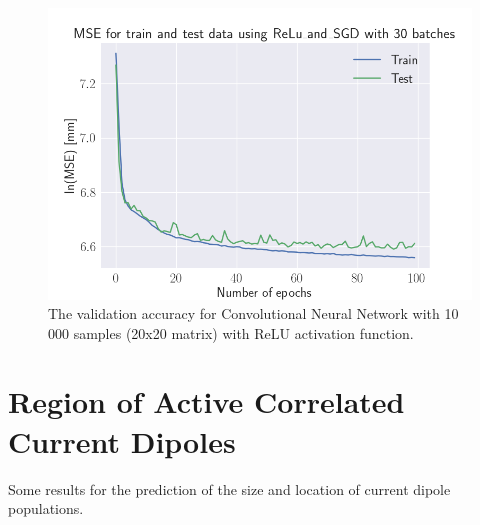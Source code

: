 \documentclass[a4paper, UKenglish, 11pt]{uiomaster}
\begin{document}
\begin{figure}[!htb]
    \centering
    \includegraphics[width=\linewidth]{../Code/plots/finals/MSE_CNN_dipoles_2_interpolated_CNN_20x20_10000_ReLu_and_SGD_30_100.png}
    \caption{The validation accuracy for Convolutional Neural Network with 10 000 samples (20x20 matrix) with ReLU activation function. }
    \label{fig:single_dipole_accuracy_CNN_2d}
\end{figure}



\section{Region of Active Correlated Current Dipoles}

Some results for the prediction of the size and location of current dipole populations.
\end{document}
